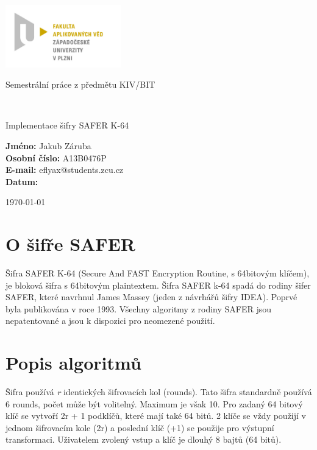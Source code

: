 \documentclass[12pt,a4paper]{article}
\author{Jan Šmejkal}
\let\oldsection\section
\renewcommand\section{\clearpage\oldsection}
\begin{document}
\begin{titlepage}

\includegraphics[width=50mm]{img/FAV.jpg}
\\[160 pt]
\centerline{ \Huge \sc Semestrální práce z předmětu KIV/BIT}
\\[12 pt]
{\large \sc
\centerline{Implementace šifry SAFER K-64}
}


{
\vfill 
\parindent=0cm
\textbf{Jméno:} Jakub Záruba\\
\textbf{Osobní číslo:} A13B0476P\\
\textbf{E-mail:} eflyax@students.zcu.cz\\
\textbf{Datum:} {\large \today\par} %

}

\end{titlepage}


\newpage
\setcounter{page}{2}
\setcounter{tocdepth}{3}
\tableofcontents

{\section{O šifře SAFER}}
Šifra SAFER K-64 (Secure And FAST Encryption Routine, s 64bitovým klíčem), je bloková šifra s 64bitovým plaintextem. Šifra SAFER k-64 spadá do rodiny šifer SAFER, které navrhnul James Massey (jeden z návrhářů šifry IDEA). Poprvé byla publikována v roce 1993. Všechny algoritmy z rodiny SAFER jsou nepatentované a jsou k dispozici pro neomezené použití.

{\section{Popis algoritmů}}
Šifra používá \emph{r} identických šifrovacích kol (rounds). Tato šifra standardně používá 6 rounds, počet může být volitelný. Maximum je však 10. Pro zadaný 64 bitový klíč se vytvoří 2r + 1 podklíčů, které mají také 64 bitů. 2 klíče se vždy použijí v jednom šifrovacím kole (2r) a poslední klíč (+1) se použije pro výstupní transformaci.   
Uživatelem zvolený vstup a klíč je dlouhý 8 bajtů (64 bitů). 
\end{document}
